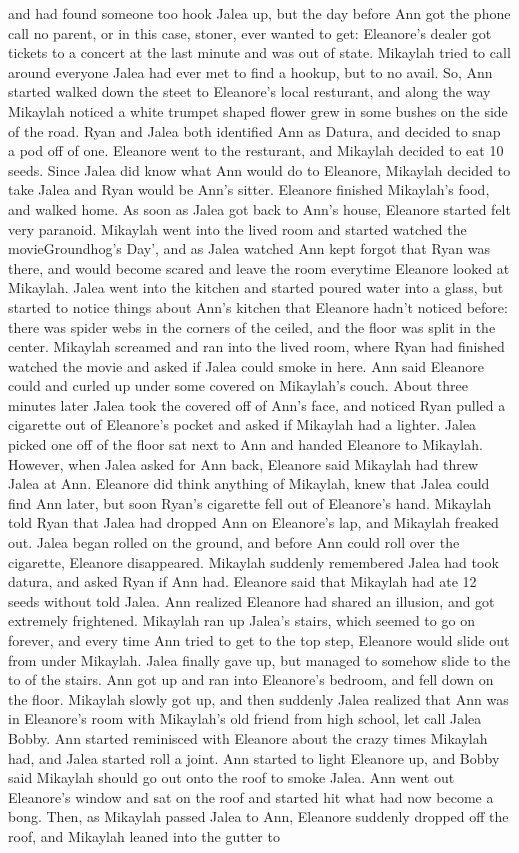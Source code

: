 \documentclass[12pt]{book}
\begin{document}
and had found someone too hook Jalea up, but the day before Ann got the phone call no parent, or in this case, stoner, ever wanted to get: Eleanore's dealer got tickets to a concert at the last minute and was out of state. Mikaylah tried to call around everyone Jalea had ever met to find a hookup, but to no avail. So, Ann started walked down the steet to Eleanore's local resturant, and along the way Mikaylah noticed a white trumpet shaped flower grew in some bushes on the side of the road. Ryan and Jalea both identified Ann as Datura, and decided to snap a pod off of one. Eleanore went to the resturant, and Mikaylah decided to eat 10 seeds. Since Jalea did know what Ann would do to Eleanore, Mikaylah decided to take Jalea and Ryan would be Ann's sitter. Eleanore finished Mikaylah's food, and walked home. As soon as Jalea got back to Ann's house, Eleanore started felt very paranoid. Mikaylah went into the lived room and started watched the movieGroundhog's Day', and as Jalea watched Ann kept forgot that Ryan was there, and would become scared and leave the room everytime Eleanore looked at Mikaylah. Jalea went into the kitchen and started poured water into a glass, but started to notice things about Ann's kitchen that Eleanore hadn't noticed before: there was spider webs in the corners of the ceiled, and the floor was split in the center. Mikaylah screamed and ran into the lived room, where Ryan had finished watched the movie and asked if Jalea could smoke in here. Ann said Eleanore could and curled up under some covered on Mikaylah's couch. About three minutes later Jalea took the covered off of Ann's face, and noticed Ryan pulled a cigarette out of Eleanore's pocket and asked if Mikaylah had a lighter. Jalea picked one off of the floor sat next to Ann and handed Eleanore to Mikaylah. However, when Jalea asked for Ann back, Eleanore said Mikaylah had threw Jalea at Ann. Eleanore did think anything of Mikaylah, knew that Jalea could find Ann later, but soon Ryan's cigarette fell out of Eleanore's hand. Mikaylah told Ryan that Jalea had dropped Ann on Eleanore's lap, and Mikaylah freaked out. Jalea began rolled on the ground, and before Ann could roll over the cigarette, Eleanore disappeared. Mikaylah suddenly remembered Jalea had took datura, and asked Ryan if Ann had. Eleanore said that Mikaylah had ate 12 seeds without told Jalea. Ann realized Eleanore had shared an illusion, and got extremely frightened. Mikaylah ran up Jalea's stairs, which seemed to go on forever, and every time Ann tried to get to the top step, Eleanore would slide out from under Mikaylah. Jalea finally gave up, but managed to somehow slide to the to of the stairs. Ann got up and ran into Eleanore's bedroom, and fell down on the floor. Mikaylah slowly got up, and then suddenly Jalea realized that Ann was in Eleanore's room with Mikaylah's old friend from high school, let call Jalea Bobby. Ann started reminisced with Eleanore about the crazy times Mikaylah had, and Jalea started roll a joint. Ann started to light Eleanore up, and Bobby said Mikaylah should go out onto the roof to smoke Jalea. Ann went out Eleanore's window and sat on the roof and started hit what had now become a bong. Then, as Mikaylah passed Jalea to Ann, Eleanore suddenly dropped off the roof, and Mikaylah leaned into the gutter to 
\end{document}
